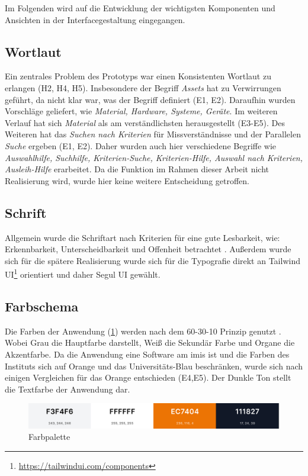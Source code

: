 Im Folgenden wird auf die Entwicklung der wichtigsten Komponenten und Ansichten in der
Interfacegestaltung eingegangen.

\subsection{Wortlaut}
Ein zentrales Problem des Prototyps war einen Konsistenten Wortlaut zu erlangen (H2, H4, H5).
Insbesondere der Begriff \textit{Assets} hat zu Verwirrungen geführt, da nicht klar war, was der
Begriff definiert (E1, E2). Daraufhin wurden Vorschläge geliefert, wie \textit{Material, Hardware,
Systeme, Geräte}. Im weiteren Verlauf hat sich \textit{Material} als am verständlichsten
herausgestellt (E3-E5). Des Weiteren hat das \textit{Suchen nach Kriterien} für Missverständnisse
und der Parallelen \textit{Suche} ergeben (E1, E2). Daher wurden auch hier verschiedene Begriffe wie
\textit{Auswahlhilfe, Suchhilfe, Kriterien-Suche, Kriterien-Hilfe, Auswahl nach Kriterien, Ausleih-Hilfe}
erarbeitet. Da die Funktion im Rahmen dieser Arbeit nicht Realisierung wird, wurde hier keine
weitere Entscheidung getroffen.

\subsection{Schrift}
Allgemein wurde die Schriftart nach Kriterien für eine gute Lesbarkeit, wie: Erkennbarkeit,
Unterscheidbarkeit und Offenheit betrachtet \cite{kommunikationsdesign_leserlichinfo}. Außerdem
wurde sich für die spätere Realisierung wurde sich für die Typografie direkt an Tailwind
UI\footnote{\url{https://tailwindui.com/components}} orientiert und daher Segul UI gewählt. 


\subsection{Farbschema}
Die Farben der Anwendung (\ref{fig:farben}) werden nach dem 60-30-10 Prinzip genutzt
\cite{experience_using}. Wobei Grau die Hauptfarbe darstellt, Weiß die Sekundär Farbe und Organe die
Akzentfarbe. Da die Anwendung eine Software am \ac{imis} ist und die Farben des Instituts sich auf
Orange und das Universitäts-Blau beschränken, wurde sich nach einigen Vergleichen für das Orange
entschieden (E4,E5). Der Dunkle Ton stellt die Textfarbe der Anwendung dar.
\begin{figure}[h]
    \centering
    \includegraphics[scale=0.23]{Bilder/farben.png}
    \caption[Farbpalette]{Farbpalette}
    \label{fig:farben}
\end{figure}

